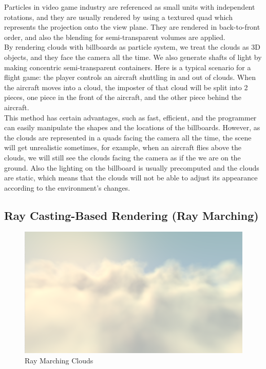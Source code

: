 Particles in video game industry are referenced as small units with independent rotations, and they are usually rendered by using a textured quad which represents the projection onto the view plane. They are rendered in back-to-front order, and also the blending for semi-transparent volumes are applied.\\
By rendering clouds with billboards as particle system, we treat the clouds as 3D objects, and they face the camera all the time. We also generate shafts of light by making concentric semi-transparent containers. Here is a typical scenario for a flight game: the player controls an aircraft shuttling in and out of clouds. When the aircraft moves into a cloud, the imposter of that cloud will be split into 2 pieces, one piece in the front of the aircraft, and the other piece behind the aircraft.\\
This method has certain advantages, such as fast, efficient, and the programmer can easily manipulate the shapes and the locations of the billboards. However, as the clouds are represented in a quads facing the camera all the time, the scene will get unrealistic sometimes, for example, when an aircraft flies above the clouds, we will still see the clouds facing the camera as if the we are on the ground. Also the lighting on the billboard is usually precomputed and the clouds are static, which means that the clouds will not be able to adjust its appearance according to the environment's changes.

\subsection{Ray Casting-Based Rendering (Ray Marching)}
\begin{figure}[htp]
\begin{center}
\includegraphics[scale=0.5]{images/raymarching.png}
\caption{Ray Marching Clouds}
\label{f3}
\end{center}
\end{figure}

